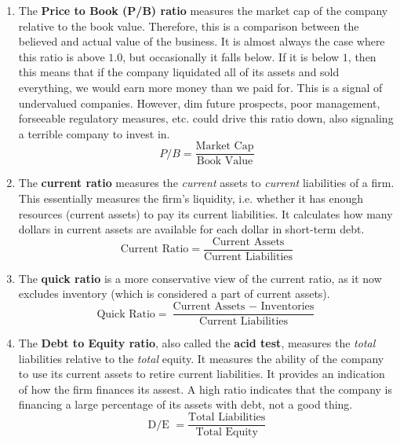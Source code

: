 \documentclass{article}
\begin{document}
\begin{enumerate}
      \item The \textbf{Price to Book (P/B) ratio} measures the market cap of the company relative to the book value. Therefore, this is a comparison between the believed and actual value of the business. It is almost always the case where this ratio is above $1.0$, but occasionally it falls below. If it is below $1$, then this means that if the company liquidated all of its assets and sold everything, we would earn more money than we paid for. This is a signal of undervalued companies. However, dim future prospects, poor management, forseeable regulatory measures, etc. could drive this ratio down, also signaling a terrible company to invest in.
      \begin{equation}
        P/B = \frac{\text{Market Cap}}{\text{Book Value}}
      \end{equation}

      \item The \textbf{current ratio} measures the \textit{current} assets to \textit{current} liabilities of a firm. This essentially measures the firm's liquidity, i.e. whether it has enough resources (current assets) to pay its current liabilities. It calculates how many dollars in current assets are available for each dollar in short-term debt.
      \begin{equation}
        \text{Current Ratio} = \frac{\text{Current Assets}}{\text{Current Liabilities}}
      \end{equation}

      \item The \textbf{quick ratio} is a more conservative view of the current ratio, as it now excludes inventory (which is considered a part of current assets).
      \begin{equation}
        \text{Quick Ratio} = \frac{\text{Current Assets } - \text{ Inventories}}{\text{Current Liabilities}}
      \end{equation}

      \item The \textbf{Debt to Equity ratio}, also called the \textbf{acid test}, measures the \textit{total} liabilities relative to the \textit{total} equity. It measures the ability of the company to use its current assets to retire current liabilities. It provides an indication of how the firm finances its assest. A high ratio indicates that the company is financing a large percentage of its assets with debt, not a good thing.
      \begin{equation}
        \text{D/E } = \frac{\text{Total Liabilities}}{\text{Total Equity}}
      \end{equation}


\end{enumerate}
\end{document}
